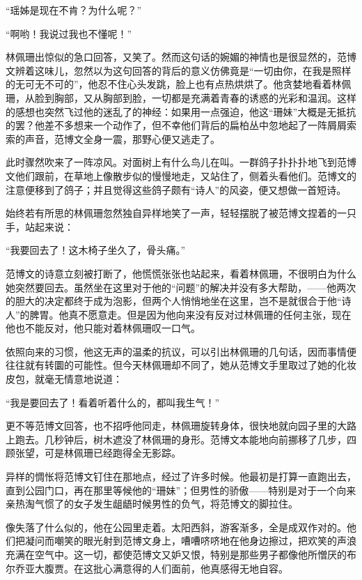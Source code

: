 \par “瑶姊是现在不肯？为什么呢？”
\par “啊哟！我说过我也不懂呢！”
\par 林佩珊出惊似的急口回答，又笑了。然而这句话的婉媚的神情也是很显然的，范博文辨着这味儿，忽然以为这句回答的背后的意义仿佛竟是“一切由你，在我是照样的无可无不可的”，他忍不住心头发跳，脸上也有点热烘烘了。他贪婪地看着林佩珊，从脸到胸部，又从胸部到脸，一切都是充满着青春的诱惑的光彩和温润。这样的感想也突然飞过他的迷乱了的神经：如果用一点强迫，他这“珊妹”大概是无抵抗的罢？他差不多想来一个动作了，但不幸他们背后的扁柏丛中忽地起了一阵屑屑索索的声音，范博文全身一震，那野心便又逃走了。
\par 此时骤然吹来了一阵凉风。对面树上有什么鸟儿在叫。一群鸽子扑扑扑地飞到范博文他们跟前，在草地上像散步似的慢慢地走，又站住了，侧着头看他们。范博文的注意便移到了鸽子；并且觉得这些鸽子颇有“诗人”的风姿，便又想做一首短诗。
\par 始终若有所思的林佩珊忽然独自异样地笑了一声，轻轻摆脱了被范博文捏着的一只手，站起来说：
\par “我要回去了！这木椅子坐久了，骨头痛。”
\par 范博文的诗意立刻被打断了，他慌慌张张也站起来，看着林佩珊，不很明白为什么她突然要回去。虽然坐在这里对于他的“问题”的解决并没有多大帮助，——他两次的胆大的决定都终于成为泡影，但两个人悄悄地坐在这里，岂不是就很合于他“诗人”的脾胃。他真不愿意走。但是因为他向来没有反对过林佩珊的任何主张，现在他也不能反对，他只能对着林佩珊叹一口气。
\par 依照向来的习惯，他这无声的温柔的抗议，可以引出林佩珊的几句话，因而事情便往往就有转圜的可能性。但今天林佩珊却不同了，她从范博文手里取过了她的化妆皮包，就毫无情意地说道：
\par “我是要回去了！看着听着什么的，都叫我生气！”
\par 更不等范博文回答，也不招呼他同走，林佩珊旋转身体，很快地就向园子里的大路上跑去。几秒钟后，树木遮没了林佩珊的身形。范博文本能地向前挪移了几步，四顾张望，可是林佩珊已经跑得全无影踪。
\par 异样的惆怅将范博文钉住在那地点，经过了许多时候。他最初是打算一直跑出去，直到公园门口，再在那里等候他的“珊妹”；但男性的骄傲——特别是对于一个向来亲热淘气惯了的女子发生龃龉时候男性的负气，将范博文的脚拉住。
\par 像失落了什么似的，他在公园里走着。太阳西斜，游客渐多，全是成双作对的。他们把凝问而嘲笑的眼光射到范博文身上，嘈嘈哜哜地在他身边擦过，把欢笑的声浪充满在空气中。这一切，都使范博文又妒又恨，特别是那些男子都像他所憎厌的布尔乔亚大腹贾。在这批心满意得的人们面前，他真感得无地自容。

